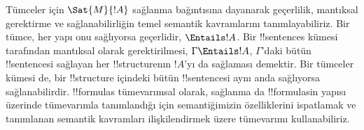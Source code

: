 \documentclass[../../../include/open-logic-section]{subfiles}
\begin{document}
Tümceler için $\Sat{M}{!A}$ sağlanma bağıntısına dayanarak geçerlilik,
mantıksal gerektirme ve sağlanabilirliğin temel semantik kavramlarını
tanımlayabiliriz. Bir tümce, her yapı onu sağlıyorsa geçerlidir,
$\Entails !A$. Bir !!{sentence}s kümesi tarafından mantıksal olarak
gerektirilmesi, $\Gamma \Entails !A$, $\Gamma$'daki bütün !!{sentence}s{}i
sağlayan her !!{structure}{}nın $!A$'yı da sağlaması demektir. Bir tümceler
kümesi de, bir !!{structure} içindeki bütün !!{sentence}s{}i aynı anda
sağlıyorsa sağlanabilirdir. !!{formula}s tümevarımsal olarak, sağlanma da
!!{formula}s{}in yapısı üzerinde tümevarımla tanımlandığı için semantiğimizin
özelliklerini ispatlamak ve tanımlanan semantik kavramları ilişkilendirmek
üzere tümevarımı kullanabiliriz.
\end{document}
